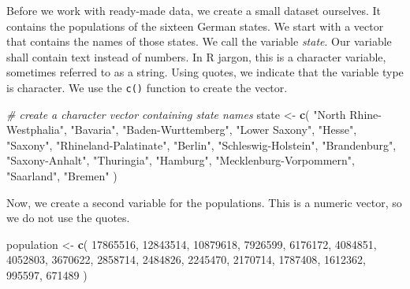 \documentclass[]{article}
\newenvironment{Shaded}{\begin{snugshade}}{\end{snugshade}}
\newcommand{\KeywordTok}[1]{\textcolor[rgb]{0.13,0.29,0.53}{\textbf{#1}}}
\newcommand{\DecValTok}[1]{\textcolor[rgb]{0.00,0.00,0.81}{#1}}
\newcommand{\StringTok}[1]{\textcolor[rgb]{0.31,0.60,0.02}{#1}}
\newcommand{\CommentTok}[1]{\textcolor[rgb]{0.56,0.35,0.01}{\textit{#1}}}
\newcommand{\NormalTok}[1]{#1}
\theoremstyle{definition}
\theoremstyle{definition}
\theoremstyle{definition}
\theoremstyle{remark}
\begin{document}
Before we work with ready-made data, we create a small dataset
ourselves. It contains the populations of the sixteen German states. We
start with a vector that contains the names of those states. We call the
variable \emph{state}. Our variable shall contain text instead of
numbers. In R jargon, this is a character variable, sometimes referred
to as a string. Using quotes, we indicate that the variable type is
character. We use the \texttt{c()} function to create the vector.

\begin{Shaded}
\begin{Highlighting}[]
\CommentTok{# create a character vector containing state names}
\NormalTok{state <-}\StringTok{ }\KeywordTok{c}\NormalTok{(}
  \StringTok{"North Rhine-Westphalia"}\NormalTok{,}
  \StringTok{"Bavaria"}\NormalTok{,}
  \StringTok{"Baden-Wurttemberg"}\NormalTok{,}
  \StringTok{"Lower Saxony"}\NormalTok{,}
  \StringTok{"Hesse"}\NormalTok{,}
  \StringTok{"Saxony"}\NormalTok{,}
  \StringTok{"Rhineland-Palatinate"}\NormalTok{,}
  \StringTok{"Berlin"}\NormalTok{,}
  \StringTok{"Schleswig-Holstein"}\NormalTok{,}
  \StringTok{"Brandenburg"}\NormalTok{,}
  \StringTok{"Saxony-Anhalt"}\NormalTok{,}
  \StringTok{"Thuringia"}\NormalTok{,}
  \StringTok{"Hamburg"}\NormalTok{,}
  \StringTok{"Mecklenburg-Vorpommern"}\NormalTok{,}
  \StringTok{"Saarland"}\NormalTok{,}
  \StringTok{"Bremen"}
\NormalTok{  )}
\end{Highlighting}
\end{Shaded}

Now, we create a second variable for the populations. This is a numeric
vector, so we do not use the quotes.

\begin{Shaded}
\begin{Highlighting}[]
\NormalTok{population <-}\StringTok{ }\KeywordTok{c}\NormalTok{(}
  \DecValTok{17865516}\NormalTok{,}
  \DecValTok{12843514}\NormalTok{,}
  \DecValTok{10879618}\NormalTok{,}
  \DecValTok{7926599}\NormalTok{,}
  \DecValTok{6176172}\NormalTok{,}
  \DecValTok{4084851}\NormalTok{,}
  \DecValTok{4052803}\NormalTok{,}
  \DecValTok{3670622}\NormalTok{,}
  \DecValTok{2858714}\NormalTok{,}
  \DecValTok{2484826}\NormalTok{,}
  \DecValTok{2245470}\NormalTok{,}
  \DecValTok{2170714}\NormalTok{,}
  \DecValTok{1787408}\NormalTok{,}
  \DecValTok{1612362}\NormalTok{,}
  \DecValTok{995597}\NormalTok{,}
  \DecValTok{671489}
\NormalTok{)}
\end{Highlighting}
\end{Shaded}
\end{document}
